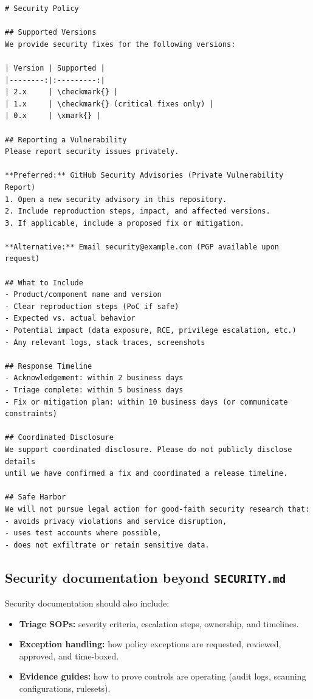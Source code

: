 \documentclass[11pt]{article}
\begin{document}
\begin{examplebox}[title={Example: Production-grade \texttt{SECURITY.md}}]
\begin{verbatim}
# Security Policy

## Supported Versions
We provide security fixes for the following versions:

| Version | Supported |
|--------:|:---------:|
| 2.x     | \checkmark{} |
| 1.x     | \checkmark{} (critical fixes only) |
| 0.x     | \xmark{} |

## Reporting a Vulnerability
Please report security issues privately.

**Preferred:** GitHub Security Advisories (Private Vulnerability Report)
1. Open a new security advisory in this repository.
2. Include reproduction steps, impact, and affected versions.
3. If applicable, include a proposed fix or mitigation.

**Alternative:** Email security@example.com (PGP available upon request)

## What to Include
- Product/component name and version
- Clear reproduction steps (PoC if safe)
- Expected vs. actual behavior
- Potential impact (data exposure, RCE, privilege escalation, etc.)
- Any relevant logs, stack traces, screenshots

## Response Timeline
- Acknowledgement: within 2 business days
- Triage complete: within 5 business days
- Fix or mitigation plan: within 10 business days (or communicate constraints)

## Coordinated Disclosure
We support coordinated disclosure. Please do not publicly disclose details
until we have confirmed a fix and coordinated a release timeline.

## Safe Harbor
We will not pursue legal action for good-faith security research that:
- avoids privacy violations and service disruption,
- uses test accounts where possible,
- does not exfiltrate or retain sensitive data.
\end{verbatim}
\end{examplebox}

\subsection{Security documentation beyond \texttt{SECURITY.md}}
Security documentation should also include:

\begin{itemize}[leftmargin=*,itemsep=2pt]
  \item \textbf{Triage SOPs:} severity criteria, escalation steps, ownership, and timelines.
  \item \textbf{Exception handling:} how policy exceptions are requested, reviewed, approved, and time-boxed.
  \item \textbf{Evidence guides:} how to prove controls are operating (audit logs, scanning configurations, rulesets).
\end{itemize}
\end{document}

